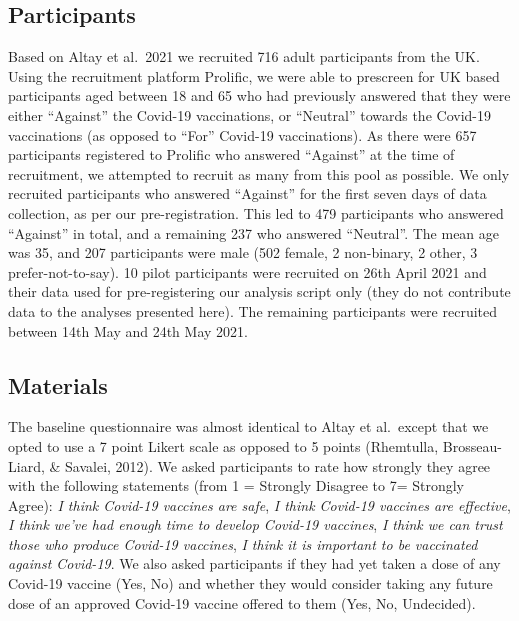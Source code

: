 \documentclass[
  english,
  ,jou,floatsintext]{apa6}
\begin{document}
\hypertarget{participants}{%
\subsection{Participants}\label{participants}}

Based on Altay et al.~2021 we recruited 716 adult participants from the UK. Using the recruitment platform Prolific, we were able to prescreen for UK based participants aged between 18 and 65 who had previously answered that they were either ``Against'' the Covid-19 vaccinations, or ``Neutral'' towards the Covid-19 vaccinations (as opposed to ``For'' Covid-19 vaccinations). As there were 657 participants registered to Prolific who answered ``Against'' at the time of recruitment, we attempted to recruit as many from this pool as possible. We only recruited participants who answered ``Against'' for the first seven days of data collection, as per our pre-registration. This led to 479 participants who answered ``Against'' in total, and a remaining 237 who answered ``Neutral''. The mean age was 35, and 207 participants were male (502 female, 2 non-binary, 2 other, 3 prefer-not-to-say). 10 pilot participants were recruited on 26th April 2021 and their data used for pre-registering our analysis script only (they do not contribute data to the analyses presented here). The remaining participants were recruited between 14th May and 24th May 2021.

\hypertarget{materials}{%
\subsection{Materials}\label{materials}}

The baseline questionnaire was almost identical to Altay et al.~except that we opted to use a 7 point Likert scale as opposed to 5 points (Rhemtulla, Brosseau-Liard, \& Savalei, 2012). We asked participants to rate how strongly they agree with the following statements (from 1 = Strongly Disagree to 7= Strongly Agree): \emph{I think Covid-19 vaccines are safe}, \emph{I think Covid-19 vaccines are effective}, \emph{I think we've had enough time to develop Covid-19 vaccines}, \emph{I think we can trust those who produce Covid-19 vaccines}, \emph{I think it is important to be vaccinated against Covid-19}. We also asked participants if they had yet taken a dose of any Covid-19 vaccine (Yes, No) and whether they would consider taking any future dose of an approved Covid-19 vaccine offered to them (Yes, No, Undecided).
\end{document}
